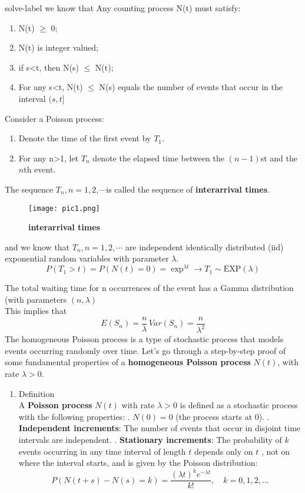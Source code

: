 	\begin{solve}{}{solve-label}
		we know that Any counting process N(t) must satisfy:\\
		\begin{enumerate}
			\item N(t) $\geq$ 0;
			\item N(t) is integer valued;
			\item if s<t, then N(s) $\leq$ N(t);
			\item For any s<t, N(t) $\leq$ N(s) equals the number of events that occur in the interval $(s,t]$
		\end{enumerate}
		Consider a Poisson process:\\
		\begin{enumerate}
			\item 	Denote the time of the first event by $T_1$.
			\item 	For any n>1, let $T_n$ denote the elapsed time between the $(n-1)$st and the $n$th event.
		\end{enumerate}
		The sequence ${T_n,n = 1,2,\cdots} $is called the sequence of \textbf{interarrival times}.
		\begin{figure}
			\captionsetup{justification=centering}
			\texttt{[image: pic1.png]}
			\caption{ \textbf{interarrival times}}
			\label{fig1}
		\end{figure}
		
		and we know that ${T_n,n=1,2,\cdots}$ are independent identically distributed (iid) exponential random variables with parameter $\lambda$.\\
		$$P(T_1 > t) = P(N(t) = 0) = \exp^{\lambda t} \rightarrow T_1 \sim \text{EXP}(\lambda )$$
		
		The total waiting time for n occurrences of the event has a Gamma distribution (with parameters $(n,\lambda)$
		\\
		This implies that
		$$E(S_n) = \frac{n}{\lambda} \, Var(S_n) = \frac{n}{\lambda^2}$$
		The homogeneous Poisson process is a type of stochastic process that models events occurring randomly over time. Let's go through a step-by-step proof of some fundamental properties of a \textbf{homogeneous Poisson process} $N(t)$, with rate $\lambda > 0$.
		
		
		\begin{enumerate}
			\item Definition\\
			A \textbf{Poisson process} $N(t)$ with rate $\lambda > 0$ is defined as a stochastic process with the following properties:
			. $N(0) = 0$ (the process starts at 0).
			. \textbf{Independent increments}: The number of events that occur in disjoint time intervals are independent.
			. \textbf{Stationary increments}: The probability of $k$ events occurring in any time interval of length \( t \) depends only on $t$ , not on where the interval starts, and is given by the Poisson distribution:
			$$P(N(t + s) - N(s) = k) = \frac{(\lambda t)^k e^{-\lambda t}}{k!}, \quad k = 0, 1, 2, \dots$$
			

\end{enumerate}
\end{solve}
